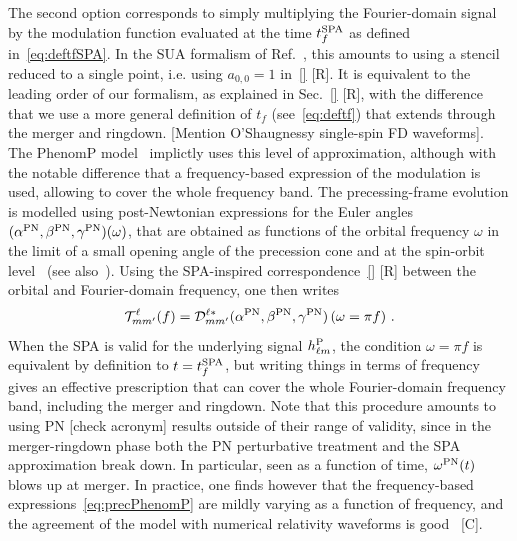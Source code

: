\documentclass[aps,showpacs,twocolumn,
prd,superscriptaddress,nofootinbib]{revtex4-1}
\newcommand{\be}{\begin{equation}}
\newcommand{\ee}{\end{equation}}
\newcommand\calT{{\mathcal{T}}}
\newcommand\calD{{\mathcal{D}}}
\newcommand{\tfSPA}{t_{f}^{\rm SPA}}
\newcommand{\SM}[1]{{\color{Red} #1}}
\begin{document}
The second option corresponds to simply multiplying the Fourier-domain signal by the modulation function evaluated at the time $\tfSPA$ as defined in~\eqref{eq:deftfSPA}. In the SUA formalism of Ref.~\cite{KCY14}, this amounts to using a stencil reduced to a single point, i.e. using $a_{0,0} = 1$ in~\eqref{} \SM{[R]}. It is equivalent to the leading order of our formalism, as explained in Sec.~\ref{} \SM{[R]}, with the difference that we use a more general definition of $t_{f}$ (see~\eqref{eq:deftf}) that extends through the merger and ringdown. \SM{[Mention O'Shaugnessy single-spin FD waveforms]}. The PhenomP model~\cite{Hannam+13} implictly uses this level of approximation, although with the notable difference that a frequency-based expression of the modulation is used, allowing to cover the whole frequency band. The precessing-frame evolution is modelled using post-Newtonian expressions for the Euler angles $(\alpha^{\rm PN}, \beta^{\rm PN}, \gamma^{\rm PN}) (\omega)$, that are obtained as functions of the orbital frequency $\omega$ in the limit of a small opening angle of the precession cone and at the spin-orbit level~\cite{Hannam+13} (see also~\cite{BBF11, MBBB13}). Using the SPA-inspired correspondence~\eqref{} \SM{[R]} between the orbital and Fourier-domain frequency, one then writes 
\be\label{eq:precPhenomP}
	\calT^{\ell}_{mm'}(f) = \calD^{\ell *}_{mm'}(\alpha^{\rm PN}, \beta^{\rm PN}, \gamma^{\rm PN}) \left( \omega=\pi f\right) \,.
\ee
When the SPA is valid for the underlying signal $h^{\rm P}_{\ell m}$, the condition $\omega = \pi f$ is equivalent by definition to $t=t^{\rm SPA}_{f}$, but writing things in terms of frequency gives an effective prescription that can cover the whole Fourier-domain frequency band, including the merger and ringdown. Note that this procedure amounts to using PN \SM{[check acronym]} results outside of their range of validity, since in the merger-ringdown phase both the PN perturbative treatment and the SPA approximation break down. In particular, seen as a function of time, $\omega^{\rm PN}(t)$ blows up at merger. In practice, one finds however that the frequency-based expressions~\eqref{eq:precPhenomP} are mildly varying as a function of frequency, and the agreement of the model with numerical relativity waveforms is good~\cite{} \SM{[C]}. 
\end{document}
